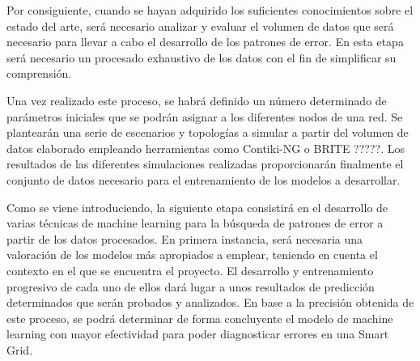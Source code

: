 \vspace{0.3cm}

Por consiguiente, cuando se hayan adquirido los suficientes conocimientos sobre el estado del arte, será necesario analizar y evaluar el volumen de datos que será necesario para llevar a cabo el desarrollo de los patrones de error. En esta etapa será necesario un procesado exhaustivo de los datos con el fin de simplificar su comprensión.

\vspace{0.3cm}

Una vez realizado este proceso, se habrá definido un número determinado de parámetros iniciales que se podrán asignar a los diferentes nodos de una red. Se plantearán una serie de escenarios y topologías a simular a partir del volumen de datos elaborado empleando herramientas como Contiki-NG o BRITE ?????. Los resultados de las diferentes simulaciones realizadas proporcionarán finalmente el conjunto de datos necesario para el entrenamiento de los modelos a desarrollar.

\vspace{0.3cm}

Como se viene introduciendo, la siguiente etapa consistirá en el desarrollo de varias técnicas de machine learning para la búsqueda de patrones de error a partir de los datos procesados. En primera instancia, será necesaria una valoración de los modelos más apropiados a emplear, teniendo en cuenta el contexto en el que se encuentra el proyecto. El desarrollo y entrenamiento progresivo de cada uno de ellos dará lugar a unos resultados de predicción determinados que serán probados y analizados. En base a la precisión obtenida de este proceso, se podrá determinar de forma concluyente el modelo de machine learning con mayor efectividad para poder diagnosticar errores en una Smart Grid. 

\vspace{0.3cm}

